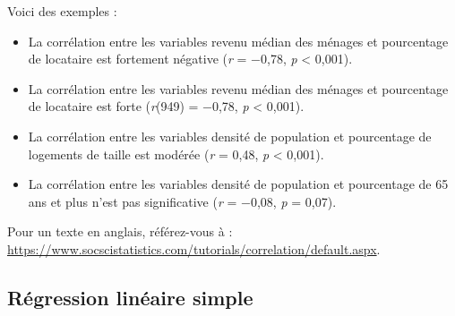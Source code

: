 \documentclass[
  11pt,
  french,
]{book}
\providecommand{\tightlist}{%
  \setlength{\itemsep}{0pt}\setlength{\parskip}{0pt}}
\begin{document}
Voici des exemples :

\begin{itemize}
\tightlist
\item
  La corrélation entre les variables revenu médian des ménages et pourcentage de locataire est fortement négative (\emph{r} = −0,78, \emph{p} \textless{} 0,001).
\item
  La corrélation entre les variables revenu médian des ménages et pourcentage de locataire est forte (\emph{r}(949) = −0,78, \emph{p} \textless{} 0,001).
\item
  La corrélation entre les variables densité de population et pourcentage de logements de taille est modérée (\emph{r} = 0,48, \emph{p} \textless{} 0,001).
\item
  La corrélation entre les variables densité de population et pourcentage de 65 ans et plus n'est pas significative (\emph{r} = −0,08, \emph{p} = 0,07).
\end{itemize}

Pour un texte en anglais, référez-vous à : \url{https://www.socscistatistics.com/tutorials/correlation/default.aspx}.

\hypertarget{sect0414}{%
\subsection{Régression linéaire simple}\label{sect0414}}
\end{document}
